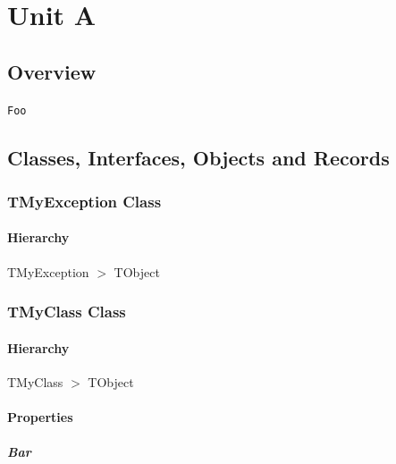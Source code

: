 \documentclass{report}
\begin{document}
\newlength{\tmplength}
\chapter{Unit A}
\section{Overview}
\begin{description}
\item[\texttt{\begin{ttfamily}TMyException\end{ttfamily} Class}]
\item[\texttt{\begin{ttfamily}TMyClass\end{ttfamily} Class}]
\end{description}
\begin{description}
\item[\texttt{Foo}] 
\end{description}
\section{Classes, Interfaces, Objects and Records}
\subsection*{TMyException Class}
\subsubsection*{\large{\textbf{Hierarchy}}\normalsize\hspace{1ex}\hfill}
TMyException {$>$} TObject
\subsection*{TMyClass Class}
\subsubsection*{\large{\textbf{Hierarchy}}\normalsize\hspace{1ex}\hfill}
TMyClass {$>$} TObject
\subsubsection*{\large{\textbf{Properties}}\normalsize\hspace{1ex}\hfill}
\paragraph*{Bar}\hspace*{\fill}
\end{document}
